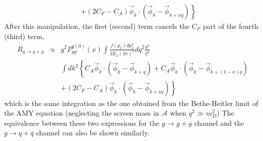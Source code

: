 \begin{appendices}
\begin{eqnarray}
&&\left.+(2C_F-C_A)\vec{\phi}_{k} \cdot \left(\vec{\phi}_k-\vec{\phi}_{k+xq} \right)
\right\}
\end{eqnarray}
After this manipulation, the first (second) term cancels the $C_F$ part of the fourth (third) term, 
\begin{eqnarray}
R_{q\rightarrow q+g} &\propto& g^2 P_{qg}^{q(0)}(x) \int  \frac{f(p_2)dp_2^3}{2E_2(2\pi)^3} d q^2 \frac{g^4}{q^4}\\\nonumber
&&  \int d k^2\left\{
C_A\vec{\phi}_{k}\cdot \left( \vec{\phi}_{k}-\vec{\phi}_{k+q} \right)
+C_A\vec{\phi}_{k} \cdot \left( \vec{\phi}_k - \vec{\phi}_{k+(1-x)q}\right) \right.\\\nonumber
&&\left.+(2C_F-C_A)\vec{\phi}_{k} \cdot \left(\vec{\phi}_k-\vec{\phi}_{k+xq} \right)
\right\}
\end{eqnarray}
which is the same integration as the one obtained from the Bethe-Heitler limit of the AMY equation (neglecting the screen mass in $\mathcal{A}$ when $q^2 \gg m_D^2$)
The equivalence between these two expressions for the $g\rightarrow g+g$ channel and the $g\rightarrow q+\bar{q}$ channel can also be shown similarly.




\end{appendices}
